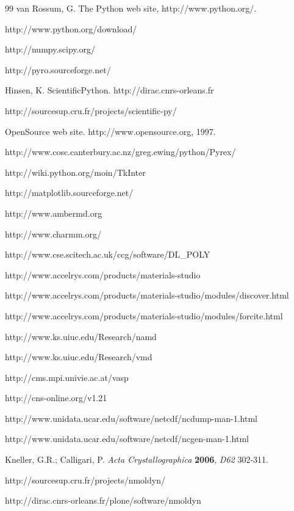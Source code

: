 \documentclass[a4paper,11pt]{article}
\begin{document}
\begin{thebibliography}{99}
 van Rossum, G. The Python web site, http://www.python.org/.

 http://www.python.org/download/

 http://numpy.scipy.org/

 http://pyro.sourceforge.net/

 Hinsen, K. ScientificPython. http://dirac.cnrs-orleans.fr

 http://sourcesup.cru.fr/projects/scientific-py/

 OpenSource web site. http://www.opensource.org, 1997.

 http://www.cosc.canterbury.ac.nz/greg.ewing/python/Pyrex/

 http://wiki.python.org/moin/TkInter

 http://matplotlib.sourceforge.net/

 http://www.ambermd.org

 http://www.charmm.org/

 http://www.cse.scitech.ac.uk/ccg/software/DL\_POLY

 http://www.accelrys.com/products/materials-studio

 http://www.accelrys.com/products/materials-studio/modules/discover.html

 http://www.accelrys.com/products/materials-studio/modules/forcite.html

 http://www.ks.uiuc.edu/Research/namd

 http://www.ks.uiuc.edu/Research/vmd

 http://cms.mpi.univie.ac.at/vasp

 http://cns-online.org/v1.21

 http://www.unidata.ucar.edu/software/netcdf/ncdump-man-1.html

 http://www.unidata.ucar.edu/software/netcdf/ncgen-man-1.html

 Kneller, G.R.; Calligari, P. \textit{Acta Crystallographica} \textbf{2006}, \textit{D62} 302-311.

 http://sourcesup.cru.fr/projects/nmoldyn/

 http://dirac.cnrs-orleans.fr/plone/software/nmoldyn


\end{thebibliography}
\end{document}
